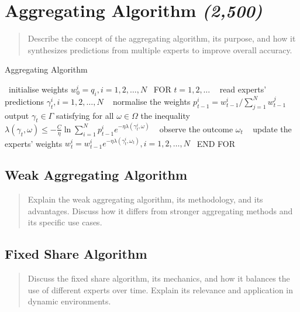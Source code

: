 \section{Aggregating Algorithm \textit{(2,500)}}\label{section:Aggregating_Algorithm}
\begin{quote}
  Describe the concept of the aggregating algorithm, its purpose, and how it synthesizes predictions from multiple experts to improve overall accuracy.
\end{quote}

\begin{algorithm}
  \caption{Aggregating Algorithm}\label{alg:cap}
  \begin{algorithmic}[1]
    \State\ initialise weights $w^i_0 = q_i, i = 1, 2, \ldots, N$
    \State\ FOR $t = 1, 2, \ldots$
    \State\ \hspace{\algorithmicindent} read experts' predictions $\gamma^i_t, i=1, 2, \ldots, N$
    \State\ \hspace{\algorithmicindent} normalise the weights $p^i_{t-1} = w^i_{t-1} / \sum^N_{j=1} w^j_{t-1}$
    \State\ \hspace{\algorithmicindent} output $\gamma_t \in \Gamma$ satisfying for all $\omega \in \Omega$ the inequality\newline\hspace*{\algorithmicindent}\hspace{\algorithmicindent} $\lambda(\gamma_t, \omega) \leq - \frac{C}{\eta} \ln \sum^N_{i=1}p^i_{t-1}e^{-\eta\lambda(\gamma^i_t, \omega)}$
    \State\ \hspace{\algorithmicindent} observe the outcome $\omega_t$
    \State\ \hspace{\algorithmicindent} update the experts' weights $w^i_t = w^i_{t-1} e^{-\eta \lambda(\gamma^i_t, \omega_t)}, i = 1, 2, \ldots, N$
    \State\ END FOR
  \end{algorithmic}
\end{algorithm}

\subsection{Weak Aggregating Algorithm}
\begin{quote}
  Explain the weak aggregating algorithm, its methodology, and its advantages. Discuss how it differs from stronger aggregating methods and its specific use cases.
\end{quote}

\subsection{Fixed Share Algorithm}
\begin{quote}
  Discuss the fixed share algorithm, its mechanics, and how it balances the use of different experts over time. Explain its relevance and application in dynamic environments.
\end{quote}

